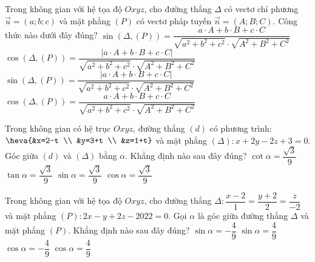 \begin{ex}%
	Trong không gian với hệ tọa độ $Oxyz$, cho đường thẳng $\Delta$ có vectơ chỉ phương $\overrightarrow{u} = (a;b;c)$ và mặt phẳng $(P)$ có vectơ pháp tuyến $\overrightarrow{n} = (A;B;C)$. Công thức  nào dưới đây đúng?
	 \choice
		{$\sin \left(\Delta, (P)\right)=\dfrac{a\cdot A+b\cdot B+c\cdot  C}{\sqrt{a^2+b^2+c^2}\cdot\sqrt{A^2+B^2+C^2}}$}
		{$\cos \left(\Delta, (P)\right)=\dfrac{\left|a\cdot A+b\cdot B+c\cdot C\right|}{\sqrt{a^2+b^2+c^2}\cdot\sqrt{A^2+B^2+C^2}}$} 
		{\True  $\sin \left(\Delta, (P)\right)=\dfrac{\left|a\cdot A+b\cdot B+c\cdot C\right|}{\sqrt{a^2+b^2+c^2}\cdot \sqrt{A^2+B^2+C^2}}$}
		{$\cos \left(\Delta, (P)\right)=\dfrac{a\cdot A+b\cdot B+c\cdot  C}{\sqrt{a^2+b^2+c^2}\cdot \sqrt{A^2+B^2+C^2}}$}
\end{ex}

\begin{ex}%
	Trong không gian  có hệ trục $Oxyz$, đường thẳng $(d)$ có phương trình: $\heva{&x=2-t \\ &y=3+t \\ &z=1+t}$ và mặt phẳng $(\Delta): x+2y-2z+3=0$. Góc giữa $(d)$ và $(\Delta)$ bằng $\alpha$. Khẳng định nào sau đây đúng?
	 \choice
		{$\cot \alpha=\dfrac{\sqrt{3}}{9}$} 
		{$\tan  \alpha=\dfrac{\sqrt{3}}{9}$}
		 {\True $\sin \alpha=\dfrac{\sqrt{3}}{9}$}
		{$\cos \alpha=\dfrac{\sqrt{3}}{9}$} 
\end{ex}

\begin{ex}%
	Trong không gian với hệ tọa  độ $Oxyz$, cho đường thẳng $\Delta: \dfrac{x-2}{1}=\dfrac{y+2}{2}=\dfrac{z}{-2}$ và mặt phẳng $(P)\colon 2x-y+2z-2022=0$. Gọi $\alpha$ là góc giữa đường thẳng $\Delta$ và mặt phẳng $(P)$. Khẳng định nào sau đây đúng?
	\choice 
		{$\sin  \alpha=-\dfrac{4}{9}$}
		{\True $\sin  \alpha=\dfrac{4}{9}$}
		{$\cos \alpha=-\dfrac{4}{9}$} 
		 {$\cos \alpha=\dfrac{4}{9}$}
\end{ex}

